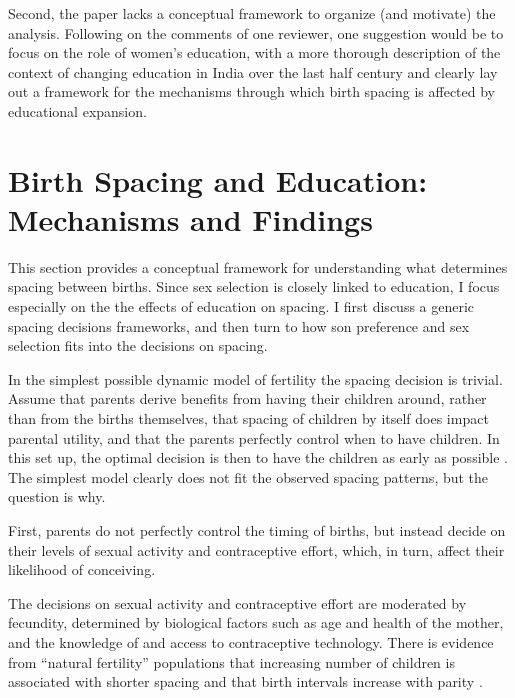 Second, the paper lacks a conceptual framework to organize (and
motivate) the analysis. Following on the comments of one reviewer, one
suggestion would be to focus on the role of women’s education, with a
more thorough description of the context of changing education in India
over the last half century and clearly lay out a framework for the
mechanisms through which birth spacing is affected by educational
expansion.

\section{Birth Spacing and Education: Mechanisms and Findings}

This section provides a conceptual framework for understanding what determines spacing 
between births.
Since sex selection is closely linked to education, I focus especially on the
the effects of education on spacing.
I first discuss a generic spacing decisions frameworks, and then turn to how son 
preference and sex selection fits into the decisions on spacing.

In the simplest possible dynamic model of fertility the spacing decision is trivial.
Assume that parents derive benefits from having their children around, rather than from 
the births themselves, that spacing of children by itself does impact parental utility, 
and that the parents perfectly control when to have children. 
In this set up, the optimal decision is then to have the children as early as possible 
\citep{Newman1988}.
The simplest model clearly does not fit the observed spacing patterns, but the question 
is why.

First, parents do not perfectly control the timing of births, but instead decide on their
levels of sexual activity and contraceptive effort, which, in turn, affect their likelihood 
of conceiving.

The decisions on sexual activity and contraceptive effort are moderated by fecundity,
determined by biological factors such as age and health of the mother, and the knowledge of and 
access to contraceptive technology.
There is evidence from ``natural fertility'' populations that increasing number of 
children is associated with shorter spacing and that birth intervals increase 
with parity \citep{Henry1961,Leridon1977}.

